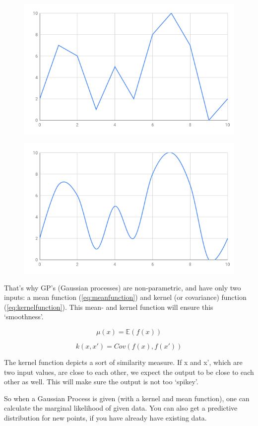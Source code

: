 \documentclass[a4paper, 10pt, conference]{ieeeconf}
\begin{document}
\begin{figure}[!ht]
    \centering
    \includegraphics[width=0.6\linewidth]{report/images/examplediagram.png}
    \caption{}
    \label{fig:examplediagram}
\end{figure}
\begin{figure}[!ht]
    \centering
    \includegraphics[width=0.6\linewidth]{report/images/examplediagram_vloeiend.png}
    \caption{}
    \label{fig:examplediagram_vloeiend}
\end{figure}

That's why GP's (Gaussian processes) are non-parametric, and have only two inputs: a mean function (\ref{eq:meanfunction}) and kernel (or covariance) function (\ref{eq:kernelfunction}). This mean- and kernel function will ensure this `smoothness'.

\begin{equation}\label{eq:meanfunction}
    \mu (x) = \mathbb{E}(f(x))
\end{equation}


\begin{equation}\label{eq:kernelfunction}
    k(x,x') = Cov(f(x), f(x'))
\end{equation}

The kernel function depicts a sort of similarity measure. If x and x', which are two input values, are close to each other, we expect the output to be close to each other as well. This will make sure the output is not too `spikey'.

So when a Gaussian Process is given (with a kernel and mean function), one can calculate the marginal likelihood of given data. You can also get a predictive distribution for new points, if you have already have existing data.
\end{document}

